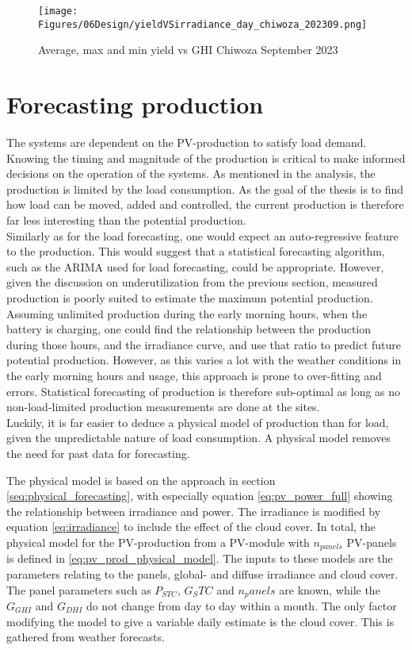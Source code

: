 \begin{figure}
  \centering
    \texttt{[image: Figures/06Design/yieldVSirradiance\_day\_chiwoza\_202309.png]}
    \caption[Yield vs irradiance September 2023]{Average, max and min yield vs GHI Chiwoza September 2023}
    \label{fig:yieldVSirradiance_day_chiwoza_202309}
\end{figure}

\section{Forecasting production}\label{seq:prod_forecasting}
The systems are dependent on the PV-production to satisfy load demand.  Knowing the timing and magnitude of the production is critical to make informed decisions on the operation of the systems. As mentioned in the analysis, the production is limited by the load consumption. As the goal of the thesis is to find how load can be moved, added and controlled, the current production is therefore far less interesting than the potential production.\\



Similarly as for the load forecasting, one would expect an auto-regressive feature to the production. This would suggest that a statistical forecasting algorithm, such as the ARIMA used for load forecasting, could be appropriate. However, given the discussion on underutilization from the previous section, measured production is poorly suited to estimate the maximum potential production. Assuming unlimited production during the early morning hours, when the battery is charging, one could find the relationship between the production during those hours, and the irradiance curve, and use that ratio to predict future potential production. However, as this varies a lot with the weather conditions in the early morning hours and usage, this approach is prone to over-fitting and errors. Statistical forecasting of production is therefore sub-optimal as long as no non-load-limited production measurements are done at the sites.\\

Luckily, it is far easier to deduce a physical model of production than for load, given the unpredictable nature of load consumption. A physical model removes the need for past data for forecasting. 

The physical model is based on the approach in section \ref{seq:physical_forecasting}, with especially equation \ref{eq:pv_power_full} showing the relationship between irradiance and power. The irradiance is modified by equation \ref{eq:irradiance} to include the effect of the cloud cover. In total, the physical model for the PV-production from a PV-module with $n_{panels}$ PV-panels is defined in \ref{eq:pv_prod_physical_model}. The inputs to these models are the parameters relating to the panels, global- and diffuse irradiance and cloud cover. The panel parameters such as $P_{STC}$, $G_STC$ and $n_panels$ are known, while the $G_{GHI}$ and $G_{DHI}$ do not change from day to day within a month. The only factor modifying the model to give a variable daily estimate is the cloud cover. This is gathered from weather forecasts. 

